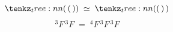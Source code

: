 \documentclass[varwidth=19cm, border=6pt]{standalone}
\begin{document}
\[
  \tntree{({}\,({}\,{}))} \;\simeq\; \tntree{(({}\,{})\,{})}
\]
\[
  {}^{3}F\,{}^{3}F \;=\; {}^{4}F\,{}^{3}F\,{}^{3}F
\]
\end{document}
